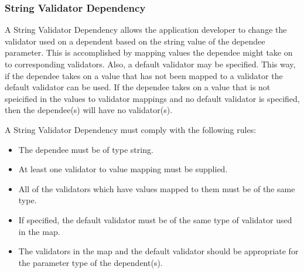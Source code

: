 \subsubsection{String Validator Dependency}
A String Validator Dependency allows the application developer to change the validator used on a dependent based on the string value of the dependee
parameter. This is accomplished by mapping values the dependee might take on to corresponding validators. Also, a default validator may be specified.
This way, if the dependee takes on a value that has not been mapped to a validator the default validator can be used. If the dependee takes on a value
that is not speicified in the values to validator mappings and no default validator is specified, then the dependee(s) will have no validator(s).

A String Validator Dependency must comply with the following rules:
\begin{itemize}
\item The dependee must be of type string.
\item At least one validator to value mapping must be supplied.
\item All of the validators which have values mapped to them must be of the same type.
\item If specified, the default validator must be of the same type of validator used in the map.
\item The validators in the map and the default validator should be appropriate for the parameter type of the dependent(s).
\end{itemize}


